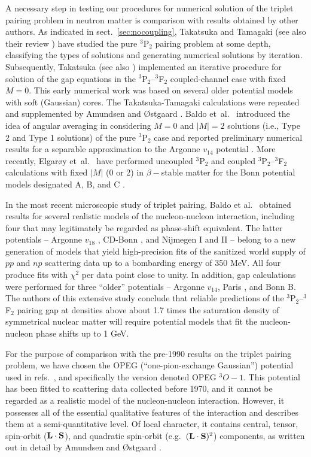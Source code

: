 A necessary step in testing our procedures for numerical solution 
of the triplet pairing problem in neutron matter is comparison with 
results obtained by other authors.  As indicated in
sect.~\ref{sec:nocoupling}, Takatsuka and Tamagaki \cite{tt71}
(see also their review \cite{ttr}) have studied the pure $^3$P$_2$ 
pairing problem at some depth, classifying the types of solutions
and generating numerical solutions by iteration.  Subsequently,
Takatsuka \cite{t72} (see also \cite{ttr}) implemented an iterative 
procedure for solution of the gap equations in the $^3$P$_2$--$^3$F$_2$ 
coupled-channel case with fixed $M = 0$.  This early numerical work 
was based on several older potential models \cite{opeg} with soft 
(Gaussian) cores.  The Takatsuka-Tamagaki calculations were repeated 
and supplemented by Amundsen and {\O}stgaard \cite{ostgaard}. 
Baldo et~al.~\cite{baldo2} introduced the idea of angular averaging in 
considering $M=0$ and $|M|=2$ solutions (i.e., Type 2 and Type 1 
solutions) of the pure $^3$P$_2$ case and reported preliminary numerical 
results for a separable approximation to the Argonne $v_{14}$ potential 
\cite{argonne14}.  More recently, Elgar{\o}y et~al.~\cite{elgaroy} 
have performed uncoupled $^3$P$_2$ and coupled $^3$P$_2$--$^3$F$_2$ 
calculations with fixed $|M|$ (0 or 2) in $\beta-$stable matter for the 
Bonn potential models designated A, B, and C \cite{bonnold1,bonnold2}.  

In the most recent microscopic study of triplet pairing, Baldo 
et al.~\cite{catoslo} obtained results for several realistic models 
of the nucleon-nucleon interaction, including four that may legitimately 
be regarded as phase-shift equivalent.  The latter potentials -- Argonne 
$v_{18}$ \cite{argonne18}, CD-Bonn \cite{bonnnew}, and Nijmegen I and 
II \cite{nijmegen} -- belong to a new generation of models that 
yield high-precision fits of the sanitized world supply of $pp$ and 
$np$ scattering data up to a bombarding energy of 350 MeV.  All four 
produce fits with $\chi^2$ per data point close to unity.  In addition, 
gap calculations were performed for three ``older'' potentials -- 
Argonne $v_{14}$, Paris \cite{paris}, and Bonn B. 
The authors of this extensive study conclude that reliable predictions 
of the $^3$P$_2$--$^3$F$_2$ pairing gap at densities above about
1.7 times the saturation density of symmetrical nuclear matter
will require potential models that fit the nucleon-nucleon phase 
shifts up to 1 GeV.

For the purpose of comparison with the pre-1990 results on the triplet 
pairing problem, we have chosen the OPEG (``one-pion-exchange Gaussian'') 
potential \cite{opeg} used in refs.~\cite{tt71,t72,ttr,ostgaard}, and 
specifically the version denoted OPEG $^3O-1$.  This potential has been 
fitted to scattering data collected before 1970, and it cannot be 
regarded as a realistic model of the nucleon-nucleon interaction.  
However, it possesses all of the essential qualitative features of 
the interaction and describes them at a semi-quantitative level.  Of 
local character, it contains central, tensor, spin-orbit 
(${\bf L} \cdot {\bf S}$), and quadratic spin-orbit 
(e.g.~$({\bf L} \cdot {\bf S})^2$) components, as written
out in detail by Amundsen and {\O}stgaard \cite{ostgaard}.

